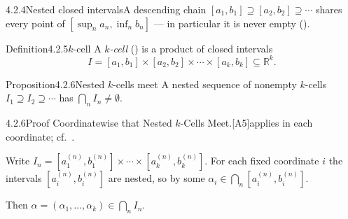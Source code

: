 \documentclass[main.tex]{subfiles}
\begin{document}
\begin{Fig}{4.2.4}{Nested closed intervals}{A descending chain $[a_1,b_1]\supseteq[a_2,b_2]\supseteq\cdots$ shares every point of $[\sup_n a_n,\inf_n b_n]$ --- in particular it is never empty ().}
\end{Fig}

\begin{Obj}{Definition}{4.2.5}{$k$-cell}
A \emph{$k$-cell} () is a product of closed intervals
\[ I=[a_1,b_1]\times[a_2,b_2]\times\cdots\times[a_k,b_k]\subseteq\mathbb R^k. \]
\end{Obj}

\begin{Obj}{Proposition}{4.2.6}{Nested $k$-cells meet}
A nested sequence of nonempty $k$-cells $I_1\supseteq I_2\supseteq\cdots$ has
$\bigcap_n I_n\neq\emptyset$.
\end{Obj}
\begin{Prf}{4.2.6}{Proof Coordinatewise that Nested $k$-Cells Meet.}{[A5]\quad applies  in each coordinate; cf.\ .}
\item Write $I_n=[a_1^{(n)},b_1^{(n)}]\times\cdots\times[a_k^{(n)},b_k^{(n)}]$. For each fixed
  coordinate $i$ the intervals $[a_i^{(n)},b_i^{(n)}]$ are nested, so by  some
  $\alpha_i\in\bigcap_n[a_i^{(n)},b_i^{(n)}]$.
\item Then $\alpha=(\alpha_1,\dots,\alpha_k)\in\bigcap_n I_n$.
\end{Prf}

\end{document}
